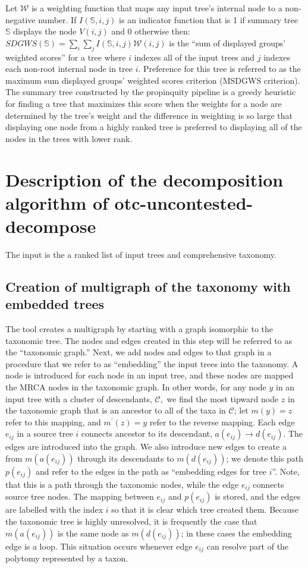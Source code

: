\documentclass[fleqn,12pt,lineno,english]{wlpeerj}
\begin{document}
Let $\mathcal{W}$ is a weighting function that maps any input tree's
internal node to a non-negative number. If $I(\mathbb{S},i,j)$ is
an indicator function that is 1 if summary tree $\mathbb{S}$ displays
the node $V(i,j)$ and 0 otherwise then: $SDGWS(\mathbb{S})=\sum_{i}\sum_{j}I(\mathbb{S},i,j)\mathcal{W}(i,j)$
is the ``sum of displayed groups' weighted scores'' for a tree where
$i$ indexes all of the input trees and $j$ indexes each non-root
internal node in tree $i$. Preference for this tree is referred to
as the maximum sum displayed groups' weighted scores criterion (MSDGWS
criterion). The summary tree constructed by the propinquity pipeline
is a greedy heuristic for finding a tree that maximizes this score
when the weights for a node are determined by the tree's weight and
the difference in weighting is so large that displaying one node from
a highly ranked tree is preferred to displaying all of the nodes in
the trees with lower rank.

\section{Description of the decomposition algorithm of otc-uncontested-decompose}\label{sec:Decompose-algorithm}

The input is the a ranked list of input trees and comprehensive taxonomy. 

\subsection{Creation of multigraph of the taxonomy with embedded trees}

The tool creates a multigraph by starting with a graph isomorphic
to the taxonomic tree. The nodes and edges created in this step will
be referred to as the ``taxonomic graph.'' Next, we add nodes and
edges to that graph in a procedure that we refer to as ``embedding''
the input trees into the taxonomy. A node is introduced for each node
in an input tree, and these nodes are mapped the MRCA nodes in the
taxonomic graph. In other words, for any node $y$ in an input tree
with a cluster of descendants, $\mathcal{C},$ we find the most tipward
node $z$ in the taxonomic graph that is an ancestor to all of the
taxa in $\mathcal{C}$; let $m(y)=z$ refer to this mapping, and $m^{\prime}(z)=y$
refer to the reverse mapping. Each edge $e_{ij}$ in a source tree
$i$ connects ancestor to its descendant, $a(e_{ij})\rightarrow d(e_{ij})$.
The edges are introduced into the graph. We also introduce new edges
to create a from $m(a(e_{ij}))$ through its descendants to $m(d(e_{ij}))$;
we denote this path $p(e_{ij})$ and refer to the edges in the path
as ``embedding edges for tree $i$''. Note, that this is a path
through the taxonomic nodes, while the edge $e_{ij}$ connects source
tree nodes. The mapping between $e_{ij}$ and $p(e_{ij})$ is stored,
and the edges are labelled with the index $i$ so that it is clear
which tree created them. Because the taxonomic tree is highly unresolved,
it is frequently the case that $m(a(e_{ij}))$ is the same node as
$m(d(e_{ij}))$; in these cases the embedding edge is a loop. This
situation occurs whenever edge $e_{ij}$ can resolve part of the polytomy
represented by a taxon. 
\end{document}
